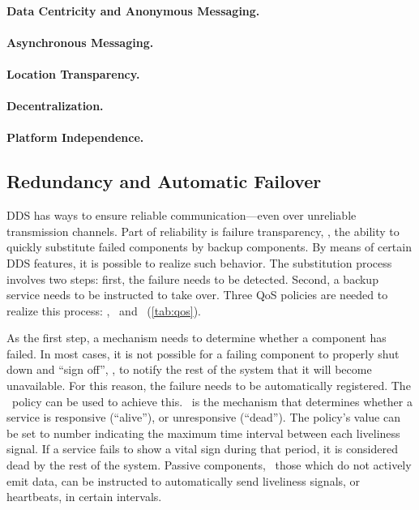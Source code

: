 \paragraph{Data Centricity and Anonymous Messaging.}

\paragraph{Asynchronous Messaging.}

\paragraph{Location Transparency.}

\paragraph{Decentralization.}

\paragraph{Platform Independence.}


\subsection{Redundancy and Automatic Failover} \label{sec:failover}
DDS has ways to ensure reliable communication---even over unreliable transmission channels. Part of reliability is failure transparency, \ie , the ability to quickly substitute failed components by backup components. By means of certain DDS features, it is possible to realize such behavior. The substitution process involves two steps: first, the failure needs to be detected. Second, a backup service needs to be instructed to take over. Three QoS policies are needed to realize this process: \ownership , \ostrength\ and \liveliness\ (\cf \autoref{tab:qos}).

As the first step, a mechanism needs to determine whether a component has failed. In most cases, it is not possible for a failing component to properly shut down and ``sign off'', \ie , to notify the rest of the system that it will become unavailable. For this reason, the failure needs to be automatically registered. The \liveliness\ policy can be used to achieve this. \liveliness\ is the mechanism that determines whether a service is responsive (``alive''), or unresponsive (``dead''). The policy's value can be set to number indicating the maximum time interval between each liveliness signal. If a service fails to show a vital sign during that period, it is considered dead by the rest of the system. Passive components, \ie\ those which do not actively emit data, can be instructed to automatically send liveliness signals, or heartbeats, in certain intervals.

